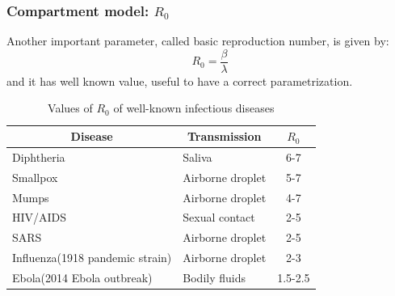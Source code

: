 \documentclass{beamer}
\begin{document}

\begin{frame}
\frametitle{Compartment model: $R_0$}

Another important parameter, called basic reproduction number, is given by:
\begin{equation}
R_0=\frac{\beta}{\lambda} \nonumber
\end{equation}
and it has well known value, useful to have a correct parametrization.

\begin{table}[H]
\begin{tabular}{|l|l|c|}
\hline
\multicolumn{1}{|c|}{\textbf{Disease}} & \multicolumn{1}{c|}{\textbf{Transmission}} & \textbf{$R_0$} \\ \hline
Diphtheria                             & Saliva                                     & 6-7         \\ \hline
Smallpox                               & Airborne droplet                           & 5-7         \\ \hline
Mumps                                  & Airborne droplet                           & 4-7         \\ \hline
HIV/AIDS                               & Sexual contact                             & 2-5         \\ \hline
SARS                                   & Airborne droplet                           & 2-5         \\ \hline
Influenza(1918 pandemic strain)        & Airborne droplet                           & 2-3         \\ \hline
Ebola(2014 Ebola outbreak)             & Bodily fluids                              & 1.5-2.5     \\ \hline
\end{tabular}
\caption{Values of $R_0$ of well-known infectious diseases}
\end{table}
\end{frame}

\end{document}

